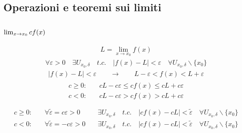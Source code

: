 \documentclass[letterpaper,10pt,italian]{jupyterBook}
\begin{document}
\subsection{Operazioni e teoremi sui limiti}
\label{\detokenize{ch/infinitesimal_calculus/analysis-notes:operazioni-e-teoremi-sui-limiti}}\label{\detokenize{ch/infinitesimal_calculus/analysis-notes:infinitesimal-calculus-limits-thms-notes}}\subsubsection*{\protect\(\lim_{x \rightarrow x_0} c f(x)\protect\)}
\begin{equation*}
\begin{split}L = \lim_{x \rightarrow x_0} f(x)\end{split}
\end{equation*}\begin{equation*}
\begin{split}\forall \varepsilon > 0 \quad \exists U_{x_0,\delta} \quad t.c. \quad |f(x) - L| < \varepsilon \quad \forall U_{x_0,\delta} \backslash \{x_0\} \end{split}
\end{equation*}\begin{equation*}
\begin{split}|f(x) - L| < \varepsilon \qquad \rightarrow \qquad L - \varepsilon < f(x) < L + \varepsilon\end{split}
\end{equation*}\begin{equation*}
\begin{split}\begin{aligned}
c \ge 0: & \quad  c L - c \varepsilon \le c f(x) \le c L + c \varepsilon \\
c  <  0: & \quad  c L - c \varepsilon   > c f(x)   > c L + c \varepsilon \\
\end{aligned}\end{split}
\end{equation*}\begin{equation*}
\begin{split}\begin{aligned}
c \ge 0: & \quad \forall \tilde{\varepsilon} =  c \varepsilon > 0 \quad & \exists U_{x_0,\delta} \quad t.c. \quad |c f(x) - c L| < \tilde{\varepsilon} \quad \forall U_{x_0,\delta} \backslash \{x_0\} \\
c <   0: & \quad \forall \tilde{\varepsilon} = -c \varepsilon > 0 \quad & \exists U_{x_0,\delta} \quad t.c. \quad |c f(x) - c L| < \tilde{\varepsilon} \quad \forall U_{x_0,\delta} \backslash \{x_0\} \\

\end{aligned}
\end{split}
\end{equation*}
\end{document}
